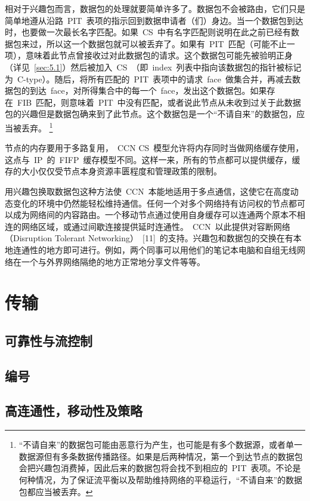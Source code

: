 相对于兴趣包而言，数据包的处理就要简单许多了。数据包不会被路由，它们只是简单地遵从沿路~PIT~表项的指示回到数据申请者（们）身边。当一个数据包到达时，也要做一次最长名字匹配。如果~CS~中有名字匹配则说明在此之前已经有数据包来过，所以这一个数据包就可以被丢弃了。如果有~PIT~匹配（可能不止一项），意味着此节点曾接收过对此数据包的请求。这个数据包可能先被验明正身（详见~\ref{sec:5.1}）然后被加入~CS~（即~index~列表中指向该数据包的指针被标记为~C-type）。随后，将所有匹配的~PIT~表项中的请求~face~做集合并，再减去数据包的到达~face，对所得集合中的每一个~face，发出这个数据包。如果存在~FIB~匹配，则意味着~PIT~中没有匹配，或者说此节点从未收到过关于此数据包的兴趣但是数据包确来到了此节点。这个数据包是一个“不请自来”的数据包，应当被丢弃。
\renewcommand\baselinestretch{1} %
\footnote{“不请自来”的数据包可能由恶意行为产生，也可能是有多个数据源，或者单一数据源但有多条数据传播路径。如果是后两种情况，第一个到达节点的数据包会把兴趣包消费掉，因此后来的数据包将会找不到相应的~PIT~表项。不论是何种情况，为了保证流平衡以及帮助维持网络的平稳运行，“不请自来”的数据包都应当被丢弃。}

节点的内存要用于多路复用，~CCN CS~模型允许将内存同时当做网络缓存使用，这点与~IP~的~FIFP~缓存模型不同。这样一来，所有的节点都可以提供缓存，缓存的大小仅仅受节点本身资源丰匮程度和管理政策的限制。

用兴趣包换取数据包这种方法使~CCN~本能地适用于多点通信，这使它在高度动态变化的环境中仍然能轻松维持通信。任何一个对多个网络持有访问权的节点都可以成为网络间的内容路由。一个移动节点通过使用自身缓存可以连通两个原本不相连的网络区域，或通过间歇连接提供延时连通性。~CCN~以此提供对容断网络（Disruption Tolerant Networking）~[11]~的支持。兴趣包和数据包的交换在有本地连通性的地方即可进行。例如，两个同事可以用他们的笔记本电脑和自组无线网络在一个与外界网络隔绝的地方正常地分享文件等等。

\section{传输}
\label{sec:3}
	\subsection{可靠性与流控制}
	\label{sec:3.1}
	\subsection{编号}
	\label{sec:3.2}
	\subsection{高连通性，移动性及策略}
	\label{sec:3.3}


